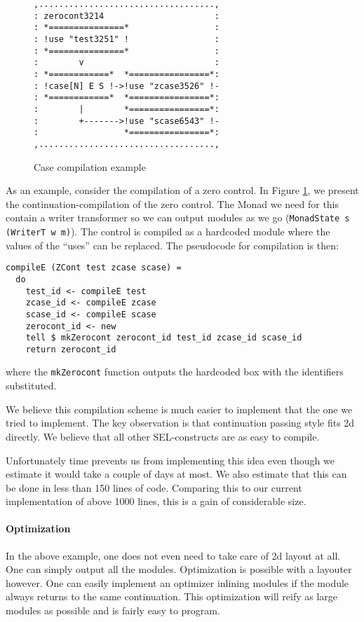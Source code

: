 \begin{figure}
  \begin{center}
\begin{verbatim}
,...................................,
: zerocont3214                      :
: *===============*                 :
: !use "test3251" !                 :
: *===============*                 :
:        v                          :
: *============*  *================*:
: !case[N] E S !->!use "zcase3526" !-
: *============*  *================*:
:      	 |        *================*:
:        +------->!use "scase6543" !-
:                 *================*:
,...................................,
\end{verbatim}
  \end{center}
  \caption{Case compilation example}
  \label{fig:2}
\end{figure}

As an example, consider the compilation of a zero control. In Figure
\ref{fig:2}, we present the continuation-compilation of the zero
control. The Monad we need for this contain a writer transformer so we
can output modules as we go (\texttt{MonadState s (WriterT w m)}). The
control is compiled as a hardcoded module where the values of the
``uses'' can be replaced. The pseudocode for compilation is then:
\begin{verbatim}
compileE (ZCont test zcase scase) =
  do
    test_id <- compileE test
    zcase_id <- compileE zcase
    scase_id <- compileE scase
    zerocont_id <- new
    tell $ mkZerocont zerocont_id test_id zcase_id scase_id
    return zerocont_id
\end{verbatim}
where the \texttt{mkZerocont} function outputs the hardcoded box with
the identifiers substituted.

We believe this compilation scheme is much easier to implement that
the one we tried to implement. The key observation is that
continuation passing style fits 2d directly. We believe that all other
SEL-constructs are as easy to compile.

Unfortunately time prevents us from implementing this idea even though
we estimate it would take a couple of days at most. We also estimate
that this can be done in less than 150 lines of code. Comparing this
to our current implementation of above 1000 lines, this is a gain of
considerable size.

\paragraph{Optimization}
\label{sec:optimization}

In the above example, one does not even need to take care of 2d layout
at all. One can simply output all the modules. Optimization is
possible with a layouter however. One can easily implement an
optimizer inlining modules if the module always returns to the same
continuation. This optimization will reify as large modules as
possible and is fairly easy to program.

